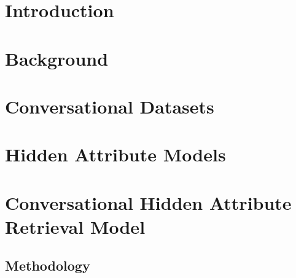 \documentclass[a4paper, 12pt, twoside]{ThesisStyle}
\begin{document}



\dominitoc





\begingroup
\hypersetup{linkcolor=black}
\tableofcontents
\endgroup

\cleardoublepage

\mainmatter

\chapter{Introduction}
\begingroup
\hypersetup{linkcolor=black}
\minitoc
\endgroup


\chapter{Background}
\label{chap_backgr}
\begingroup
\hypersetup{linkcolor=black}
\minitoc
\endgroup




\chapter{Conversational Datasets}
\label{chap_datasets}
\begingroup
\hypersetup{linkcolor=black}
\minitoc
\endgroup





\chapter{Hidden Attribute Models}
\label{chap_ham}
\begingroup
\hypersetup{linkcolor=black}
\minitoc
\endgroup









\chapter{Conversational Hidden Attribute Retrieval Model}
\label{chap_charm}
\begingroup
\hypersetup{linkcolor=black}
\minitoc
\endgroup




\section{Methodology}

\end{document}
